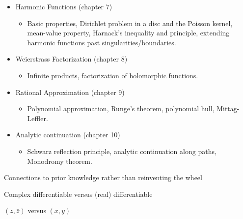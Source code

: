 \documentclass[10pt,aspectratio=169]{beamer}
\begin{document}
\begin{frame}
\begin{itemize}

\item Harmonic Functions (chapter 7)
\begin{itemize}
\item
Basic properties, Dirichlet problem in a disc and the Poisson kernel,
mean-value property, Harnack's inequality and principle,
extending harmonic functions past singularities/boundaries.
\end{itemize}

\pause
\item Weierstrass Factorization (chapter 8)
\begin{itemize}
\item
Infinite products, factorization of holomorphic functions.
\end{itemize}

\pause
\item Rational Approximation (chapter 9)
\begin{itemize}
\item
Polynomial approximation, Runge's theorem, polynomial hull, Mittag-Leffler.
\end{itemize}

\pause
\item Analytic continuation (chapter 10)
\begin{itemize}
\item
Schwarz reflection principle, analytic continuation along paths, Monodromy
theorem.
\end{itemize}
\end{itemize}

\end{frame}

\begin{frame}
Connections to prior knowledge rather than reinventing the wheel

\medskip
\pause

Complex differentiable versus (real) differentiable

\medskip
\pause

$(z,\bar{z})$ versus $(x,y)$
\end{frame}
\end{document}
